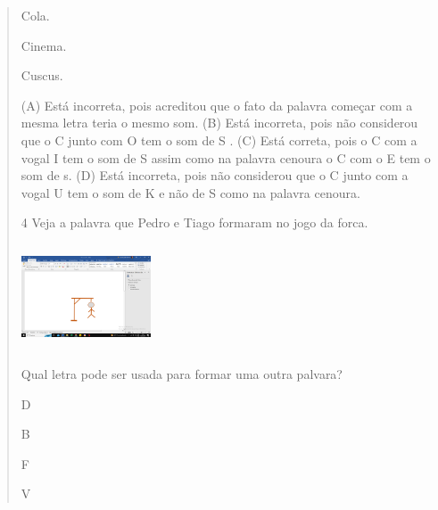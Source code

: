 \begin{verse}
\begin{minipage}{.5\textwidth}
\begin{escolha}
\item Cola.

\item Cinema.

\item Cuscus.
\end{escolha}
\end{minipage}

(A) Está incorreta, pois acreditou que o fato da palavra começar com a mesma letra teria o mesmo som.
(B) Está incorreta, pois não considerou que o C junto com O tem o som de S .
(C) Está correta, pois o C com a vogal I tem o som de S assim como na
palavra cenoura o C com o E tem o som de s.
(D) Está incorreta, pois não considerou que o C junto com a vogal U tem
o som de K e não de S como na palavra cenoura.

\num{4} Veja a palavra que Pedro e Tiago formaram no jogo da forca.

\includegraphics[width=1.50909in,height=1.22355in]{media/image150.png}

Qual letra pode ser usada para formar uma outra palvara?

\begin{minipage}{.5\textwidth}
\begin{escolha}
\item D

\item B

\item F

\item V
\end{escolha}
\end{minipage}


\end{verse}
